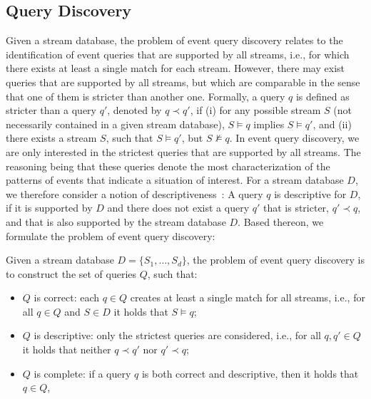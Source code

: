 \subsection{Query Discovery}
\label{sec:discovery}
Given a stream database, the problem of event query discovery relates to
the identification of event queries that are supported by all streams, i.e., for
which there exists at least a single match for each stream.
However, there may exist queries that are
supported
by all streams, but which are comparable in the sense that one of them
is stricter than another one. Formally, a query $q$ is defined as stricter
than a query $q'$, denoted by $q\prec q'$, if
(i) for any possible stream $S$ (not necessarily contained in a given stream
database), $S \models q$ implies $S
\models q'$, and (ii) there exists a stream $S$, such that $S \models q'$,
but $S \not\models q$.
In event query discovery, we are only interested in the strictest queries
that are supported by all streams. The reasoning being that these queries
denote the most  characterization of the patterns of events
that
indicate a situation of interest. For a stream database $D$, we therefore
consider a notion of descriptiveness~\cite{icdt2022}: A query $q$ is descriptive for $D$,
if it is supported by $D$ and
there does not exist a query $q'$ that is stricter, $q'\prec q$, and that is
also supported by the stream database $D$.
Based thereon, we formulate the problem of event query discovery:
\begin{problem}
\label{problem}
Given a stream database $D=\{S_1,\ldots, S_d\}$,
the problem of event query discovery is to construct the set of queries $Q$,
such that:
\begin{itemize}[nosep,left=1em]
  \item ${Q}$ is correct: each $q\in Q$ creates at least a single match for
  all streams, i.e., for all $q\in Q$ and $S\in D$ it holds that $S \models
  q$;
  \item ${Q}$ is descriptive: only the strictest queries are considered,
  i.e., for all $q,q'\in Q$ it holds that neither $q\prec q'$ nor $q'\prec q$;
  \item ${Q}$ is complete: if a query $q$ is both correct and descriptive,
  then it holds that $q\in Q$, 
  \end{itemize}
\end{problem}
